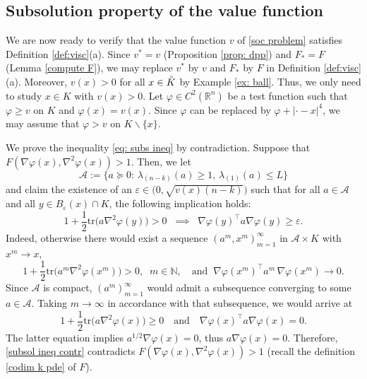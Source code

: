 \documentclass[11pt]{amsart}
\numberwithin{equation}{section}
\begin{document}
\subsection{Subsolution property of the value function} \label{subsec: sub}

We are now ready to verify that the value function $v$ of \eqref{soc problem} satisfies Definition \ref{def:visc}(a). Since $v^*=v$ (Proposition \ref{prop: dpp}) and $F_*=F$ (Lemma \ref{compute F}), we may replace $v^*$ by $v$ and $F_*$ by $F$ in Definition \ref{def:visc}(a). Moreover, $v(x)>0$ for all $x\in \accentset{\circ}{K}$ by Example \ref{ex: ball}. Thus, we only need to study $x\in K$ with $v(x)>0$. Let $\varphi\in C^2(\mathbb{R}^n)$ be a test function such that $\varphi\ge v$ on $K$ and $\varphi(x)=v(x)$. Since $\varphi$ can be replaced by $\varphi+|\cdot-x|^4$, we may assume that $\varphi>v$ on $K\backslash\{x\}$.

\medskip

We prove the inequality \eqref{eq: subs ineq} by contradiction. Suppose that $F(\nabla\varphi(x),\nabla^2\varphi(x))>1$. Then, we let 
\begin{equation}
\mathcal{A}:=\big\{a\succeq0:\,\lambda_{(n-k)}(a)\ge1,\,\lambda_{(1)}(a)\le L\big\}
\end{equation}
and claim the existence of an $\varepsilon \in \big(0, \sqrt{v(x)(n-k)}\big)$ such that for all $a \in \mathcal{A}$ and all $y \in B_{\varepsilon}(x)\cap K$, the following implication holds:
\begin{equation}\label{eq: subsol ineq}
1 + \frac{1}{2} \text{tr}\big(a\nabla^2\varphi(y)\big) > 0 \;\;\implies\;\; \nabla \varphi(y)^{\top} a \nabla \varphi(y)\geq \varepsilon. 
\end{equation} 
Indeed, otherwise there would exist a sequence $(a^m,x^m)_{m=1}^\infty$ in  $\mathcal{A}\times K$ with $x^m \to x$,
\begin{equation}
1+\frac{1}{2}\mathrm{tr}\big(a^m \nabla^2\varphi(x^m)\big) > 0,\;\; m\in\mathbb{N},\quad
\text{and}\;\; \nabla\varphi(x^m)^{\top}a^m\,\nabla\varphi(x^m) \to 0.
\end{equation}
Since $\mathcal{A}$ is compact, $(a^m)_{m=1}^\infty$ would admit a subsequence converging to some $a\in\mathcal{A}$. Taking $m\to\infty$ in accordance with that subsequence, we would arrive at
\begin{equation}\label{subsol ineq contr}
1+\frac{1}{2}\mathrm{tr}\big(a\nabla^2\varphi(x)\big) \geq 0\quad\text{and}\quad \nabla\varphi(x)^{\top}a\nabla\varphi(x) = 0.
\end{equation}
The latter equation implies $a^{1/2}\nabla\varphi(x)=0$, thus $a\nabla\varphi(x)=0$. Therefore, \eqref{subsol ineq contr} contradicts $F(\nabla\varphi(x),\nabla^2\varphi(x))>1$ (recall the definition \eqref{codim k pde} of $F$).
\end{document}
